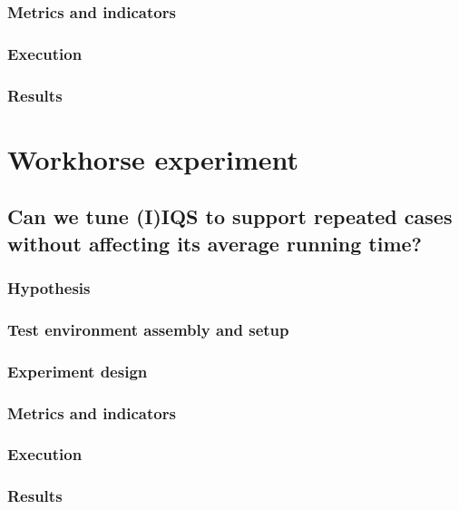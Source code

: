 \documentclass{iccmemoria}
\begin{document}
\subsubsection{Metrics and indicators}
\subsubsection{Execution}
\subsubsection{Results}

\section{Workhorse experiment}

\subsection{Can we tune (I)IQS to support repeated cases without affecting its average running time?}
\subsubsection{Hypothesis}
\subsubsection{Test environment assembly and setup}
\subsubsection{Experiment design}
\subsubsection{Metrics and indicators}
\subsubsection{Execution}
\subsubsection{Results}
\end{document}
